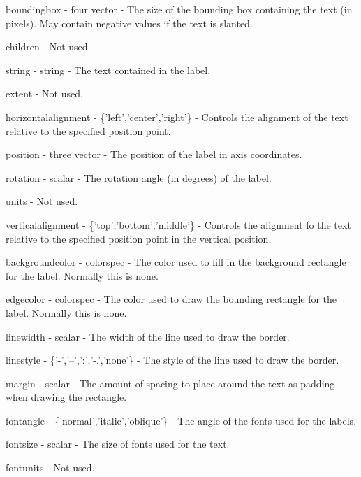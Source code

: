 \begin{DoxyItemize}
\item {\ttfamily boundingbox} -\/ {\ttfamily four vector} -\/ The size of the bounding box containing the text (in pixels). May contain negative values if the text is slanted.  
\item {\ttfamily children} -\/ Not used.  
\item {\ttfamily string} -\/ {\ttfamily string} -\/ The text contained in the label.  
\item {\ttfamily extent} -\/ Not used.  
\item {\ttfamily horizontalalignment} -\/ {\ttfamily \{'left','center','right'\}} -\/ Controls the alignment of the text relative to the specified position point.  
\item {\ttfamily position} -\/ {\ttfamily three vector} -\/ The position of the label in axis coordinates.  
\item {\ttfamily rotation} -\/ {\ttfamily scalar} -\/ The rotation angle (in degrees) of the label.  
\item {\ttfamily units} -\/ Not used.  
\item {\ttfamily verticalalignment} -\/ {\ttfamily \{'top','bottom','middle'\}} -\/ Controls the alignment fo the text relative to the specified position point in the vertical position.  
\item {\ttfamily backgroundcolor} -\/ {\ttfamily colorspec} -\/ The color used to fill in the background rectangle for the label. Normally this is {\ttfamily none}.  
\item {\ttfamily edgecolor} -\/ {\ttfamily colorspec} -\/ The color used to draw the bounding rectangle for the label. Normally this is {\ttfamily none}.  
\item {\ttfamily linewidth} -\/ {\ttfamily scalar} -\/ The width of the line used to draw the border.  
\item {\ttfamily linestyle} -\/ {\ttfamily \{'-\/','--','\-:','-\/.','none'\}} -\/ The style of the line used to draw the border.  
\item {\ttfamily margin} -\/ {\ttfamily scalar} -\/ The amount of spacing to place around the text as padding when drawing the rectangle.  
\item {\ttfamily fontangle} -\/ {\ttfamily \{'normal','italic','oblique'\}} -\/ The angle of the fonts used for the labels.  
\item {\ttfamily fontsize} -\/ {\ttfamily scalar} -\/ The size of fonts used for the text.  
\item {\ttfamily fontunits} -\/ Not used.  

\end{DoxyItemize}
